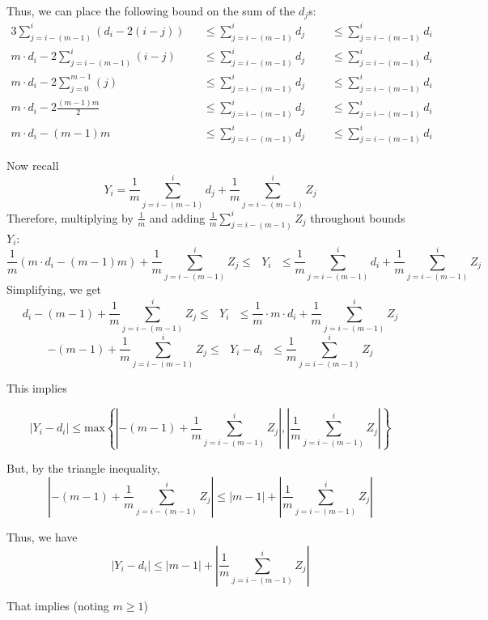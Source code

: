 \documentclass[paper=a4, fontsize=11pt]{scrartcl} %
\numberwithin{equation}{section} %
\numberwithin{figure}{section} %
\numberwithin{table}{section} %
\begin{document}
Thus, we can place the following bound on the sum of the $d_j$s:
\begin{alignat*}{3}
\sum_{j = i - (m-1)}^{i} \left(d_i - 2 (i-j) \right) && \leq \sum_{j = i - (m-1)}^{i} d_j \textrm{ }&& \leq \sum_{j = i - (m-1)}^{i} d_i \\
m \cdot d_i - 2\sum_{j = i - (m-1)}^{i} \left(i-j \right) && \leq \sum_{j = i - (m-1)}^{i} d_j \textrm{ }&& \leq \sum_{j = i - (m-1)}^{i} d_i \\
m \cdot d_i - 2\sum_{j = 0}^{m-1} \left(j \right) && \leq \sum_{j = i - (m-1)}^{i} d_j \textrm{ }&& \leq \sum_{j = i - (m-1)}^{i} d_i \\
m \cdot d_i - 2 \frac{(m-1)m}{2} && \leq \sum_{j = i - (m-1)}^{i} d_j \textrm{ }&& \leq \sum_{j = i - (m-1)}^{i} d_i \\
m \cdot d_i - (m-1)m && \leq \sum_{j = i - (m-1)}^{i} d_j \textrm{ }&& \leq \sum_{j = i - (m-1)}^{i} d_i
\end{alignat*}

Now recall
\[Y_i = \frac{1}{m} \sum_{j = i - (m-1)}^{i} d_j + \frac{1}{m} \sum_{j = i - (m-1)}^{i} Z_j\]
Therefore, multiplying by $\frac{1}{m}$ and adding $\frac{1}{m} \sum_{j = i - (m - 1)}^{i} Z_j$ throughout bounds $Y_i$:
\[
\frac{1}{m} \left( m \cdot d_i - (m-1)m \right) +\frac{1}{m} \sum_{j = i - (m - 1)}^{i} Z_j \leq \textrm{ } Y_i   \textrm{ } \leq \frac{1}{m} \sum_{j = i - (m-1)}^{i} d_i + \frac{1}{m}  \sum_{j = i - (m - 1)}^{i} Z_j\]
Simplifying, we get
\[
d_i - (m-1) +\frac{1}{m}  \sum_{j = i - (m - 1)}^{i} Z_j \leq \textrm{ }  Y_i  \textrm{ }  \leq \frac{1}{m} \cdot m \cdot d_i +  \frac{1}{m} \sum_{j = i - (m - 1)}^{i} Z_j\]
\[
-(m-1) +\frac{1}{m}  \sum_{j = i - (m - 1)}^{i} Z_j \leq \textrm{ }  Y_i - d_i \textrm{ }  \leq  \frac{1}{m} \sum_{j = i - (m - 1)}^{i} Z_j\]

This implies

\[ \left|Y_i - d_i \right| \leq \textrm{max}\left\{\left| -(m-1) + \frac{1}{m} \sum_{j = i - (m-1)}^{i} Z_j \right|, \left| \frac{1}{m} \sum_{j = i - (m-1)}^{i} Z_j \right| \right\}\]

But, by the triangle inequality,
\[ \left| -(m-1) + \frac{1}{m} \sum_{j = i - (m-1)}^{i} Z_j \right| \leq \left| m-1 \right| + \left| \frac{1}{m} \sum_{j = i - (m-1)}^{i} Z_j \right| \]

Thus, we have
\[ \left|Y_i - d_i \right| \leq \left| m-1 \right| + \left| \frac{1}{m} \sum_{j = i - (m-1)}^{i} Z_j \right| \]

That implies (noting $m \geq 1$)
\end{document}
